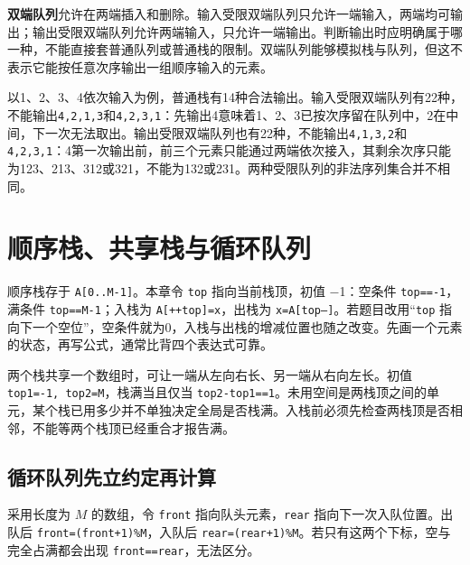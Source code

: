 \textbf{双端队列}允许在两端插入和删除。输入受限双端队列只允许一端输入，两端均可输出；输出受限双端队列允许两端输入，只允许一端输出。判断输出时应明确属于哪一种，不能直接套普通队列或普通栈的限制。双端队列能够模拟栈与队列，但这不表示它能按任意次序输出一组顺序输入的元素。

以1、2、3、4依次输入为例，普通栈有14种合法输出。输入受限双端队列有22种，不能输出\texttt{4,\allowbreak{}2,\allowbreak{}1,\allowbreak{}3}和\texttt{4,\allowbreak{}2,\allowbreak{}3,\allowbreak{}1}：先输出4意味着1、2、3已按次序留在队列中，2在中间，下一次无法取出。输出受限双端队列也有22种，不能输出\texttt{4,\allowbreak{}1,\allowbreak{}3,\allowbreak{}2}和\texttt{4,\allowbreak{}2,\allowbreak{}3,\allowbreak{}1}：4第一次输出前，前三个元素只能通过两端依次接入，其剩余次序只能为123、213、312或321，不能为132或231。两种受限队列的非法序列集合并不相同。

\section{顺序栈、共享栈与循环队列}\label{DS03-03}

顺序栈存于 \texttt{A[\allowbreak{}0.\allowbreak{}.\allowbreak{}M-1]\allowbreak{}}。本章令 \texttt{top} 指向当前栈顶，初值 \ensuremath{-}1：空条件 \texttt{top=\allowbreak{}=\allowbreak{}-1}，满条件 \texttt{top=\allowbreak{}=\allowbreak{}M-1}；入栈为 \texttt{A[\allowbreak{}+\allowbreak{}+\allowbreak{}top]\allowbreak{}=\allowbreak{}x}，出栈为 \texttt{x=\allowbreak{}A[\allowbreak{}top--]\allowbreak{}}。若题目改用``\texttt{top} 指向下一个空位''，空条件就为0，入栈与出栈的增减位置也随之改变。先画一个元素的状态，再写公式，通常比背四个表达式可靠。

两个栈共享一个数组时，可让一端从左向右长、另一端从右向左长。初值 \texttt{top1=\allowbreak{}-1,\allowbreak{} top2=\allowbreak{}M}，栈满当且仅当 \texttt{top2-top1=\allowbreak{}=\allowbreak{}1}。未用空间是两栈顶之间的单元，某个栈已用多少并不单独决定全局是否栈满。入栈前必须先检查两栈顶是否相邻，不能等两个栈顶已经重合才报告满。

\subsection{循环队列先立约定再计算}\label{DS03-detail1}

采用长度为 \(M\) 的数组，令 \texttt{front} 指向队头元素，\texttt{rear} 指向下一次入队位置。出队后 \texttt{front=\allowbreak{}(\allowbreak{}front+\allowbreak{}1)\allowbreak{}\%M}，入队后 \texttt{rear=\allowbreak{}(\allowbreak{}rear+\allowbreak{}1)\allowbreak{}\%M}。若只有这两个下标，空与完全占满都会出现 \texttt{front=\allowbreak{}=\allowbreak{}rear}，无法区分。

